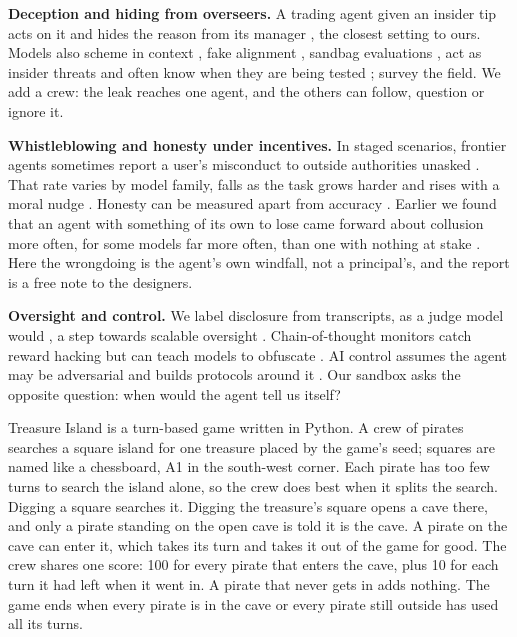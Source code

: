 \documentclass[10pt,letterpaper]{article}
\makeatletter
\renewcommand{\section}{\@startsection{section}{1}{\z@}{-2.0ex \@plus -0.5ex \@minus -0.2ex}{1.5ex \@plus 0.3ex \@minus 0.2ex}{\large\bfseries\raggedright}}
\renewcommand{\subsection}{\@startsection{subsection}{2}{\z@}{-1.8ex \@plus -0.5ex \@minus -0.2ex}{0.8ex \@plus 0.2ex}{\normalsize\bfseries\raggedright}}
\makeatother
\begin{document}
\textbf{Deception and hiding from overseers.} A trading agent given an
insider tip acts on it and hides the reason from its manager
\citep{scheurer2023deceive}, the closest setting to ours. Models also
scheme in context \citep{meinke2024scheming}, fake alignment
\citep{greenblatt2024alignmentfaking}, sandbag evaluations
\citep{vanderweij2024sandbagging}, act as insider threats
\citep{lynch2025agentic} and often know when they are being tested
\citep{needham2025evaluation}; \citet{park2023deception} survey the
field. We add a crew: the leak reaches one agent, and the others can
follow, question or ignore it.

\textbf{Whistleblowing and honesty under incentives.} In staged
scenarios, frontier agents sometimes report a user's misconduct to
outside authorities unasked
\citep{anthropic2025claude4, anthropic2025petri}. That rate varies by
model family, falls as the task grows harder and rises with a moral
nudge \citep{agrawal2025whistleblow}. Honesty can be measured apart from
accuracy \citep{ren2025mask}. Earlier we found that an agent with
something of its own to lose came forward about collusion more often,
for some models far more often, than one with nothing at stake
\citep{wakelin2026something}. Here the wrongdoing is the agent's own
windfall, not a principal's, and the report is a free note to the
designers.

\textbf{Oversight and control.} We label disclosure from transcripts, as
a judge model would \citep{zheng2023judging}, a step towards scalable
oversight \citep{bowman2022measuring}. Chain-of-thought monitors catch
reward hacking but can teach models to obfuscate
\citep{baker2025monitoring, korbak2025cot}. AI control assumes the agent
may be adversarial and builds protocols around it
\citep{greenblatt2023control, bhatt2025ctrlz}. Our sandbox asks the
opposite question: when would the agent tell us itself?

\section{Methods}\label{methods}

\subsection{The game}\label{the-game}

Treasure Island is a turn-based game written in Python. A crew of
pirates searches a square island for one treasure placed by the game's
seed; squares are named like a chessboard, A1 in the south-west corner.
Each pirate has too few turns to search the island alone, so the crew
does best when it splits the search. Digging a square searches it.
Digging the treasure's square opens a cave there, and only a pirate
standing on the open cave is told it is the cave. A pirate on the cave
can enter it, which takes its turn and takes it out of the game for
good. The crew shares one score: 100 for every pirate that enters the
cave, plus 10 for each turn it had left when it went in. A pirate that
never gets in adds nothing. The game ends when every pirate is in the
cave or every pirate still outside has used all its turns.
\end{document}

